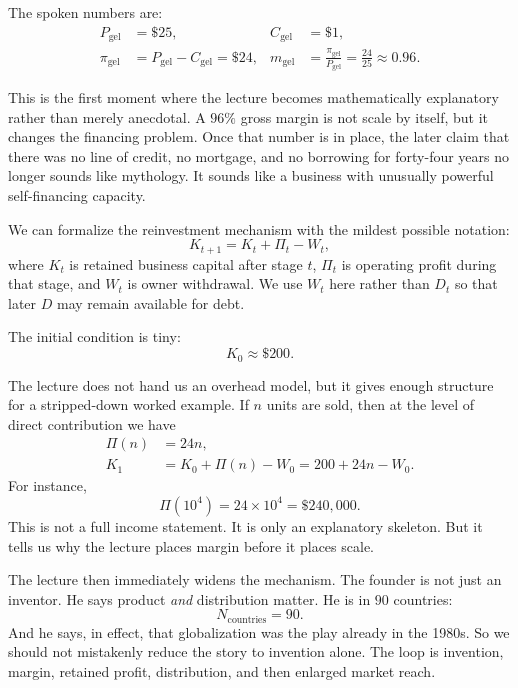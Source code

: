 The spoken numbers are:
\begin{align}
P_{\mathrm{gel}} &= \$25, &
C_{\mathrm{gel}} &= \$1, \\
\pi_{\mathrm{gel}} &= P_{\mathrm{gel}}-C_{\mathrm{gel}}=\$24, &
m_{\mathrm{gel}} &= \frac{\pi_{\mathrm{gel}}}{P_{\mathrm{gel}}}
= \frac{24}{25}\approx 0.96 .
\end{align}

This is the first moment where the lecture becomes mathematically explanatory rather than merely anecdotal. A \(96\%\) gross margin is not scale by itself, but it changes the financing problem. Once that number is in place, the later claim that there was no line of credit, no mortgage, and no borrowing for forty-four years no longer sounds like mythology. It sounds like a business with unusually powerful self-financing capacity.

We can formalize the reinvestment mechanism with the mildest possible notation:
\begin{equation}
K_{t+1}=K_t+\Pi_t-W_t,
\end{equation}
where \(K_t\) is retained business capital after stage \(t\), \(\Pi_t\) is operating profit during that stage, and \(W_t\) is owner withdrawal. We use \(W_t\) here rather than \(D_t\) so that later \(D\) may remain available for debt.

The initial condition is tiny:
\begin{equation}
K_0 \approx \$200.
\end{equation}

The lecture does not hand us an overhead model, but it gives enough structure for a stripped-down worked example. If \(n\) units are sold, then at the level of direct contribution we have
\begin{align}
\Pi(n) &= 24n, \\
K_1 &= K_0 + \Pi(n) - W_0 = 200 + 24n - W_0 .
\end{align}
For instance,
\begin{equation}
\Pi(10^4)=24\times 10^4=\$240{,}000.
\end{equation}
This is not a full income statement. It is only an explanatory skeleton. But it tells us why the lecture places margin before it places scale.

The lecture then immediately widens the mechanism. The founder is not just an inventor. He says product \emph{and} distribution matter. He is in \(90\) countries:
\begin{equation}
N_{\mathrm{countries}}=90.
\end{equation}
And he says, in effect, that globalization was the play already in the 1980s. So we should not mistakenly reduce the story to invention alone. The loop is invention, margin, retained profit, distribution, and then enlarged market reach.

